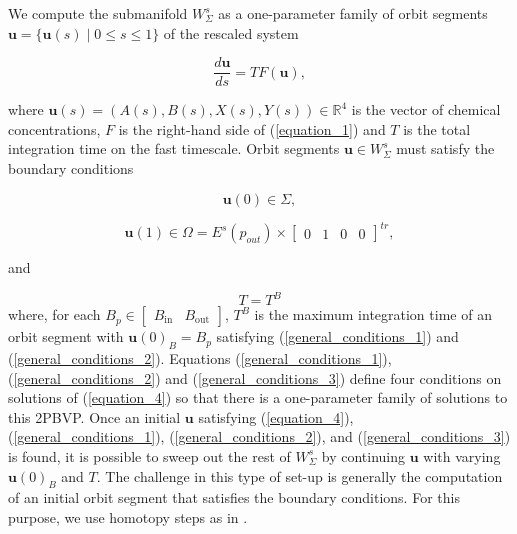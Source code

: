 \documentclass{ws-ijbc}
\begin{document}
We compute the submanifold $W^s_{\Sigma}$ as a one-parameter family of orbit segments $\mathbf{u} = \{\mathbf{u}(s) \;|\; 0 \leq s \leq 1 \}$ of the rescaled system

\begin{equation}
\frac{d\mathbf{u}}{ds} = TF(\mathbf{u}),
\label{equation_4}
\end{equation}
    
\noindent
where $\mathbf{u}(s) = (A(s), B(s), X(s), Y(s)) \in \mathbb{R}^4$ is the vector of chemical concentrations, $F$ is the right-hand side of (\ref{equation_1}) and $T$ is the total integration time on the fast timescale.  Orbit segments $\mathbf{u} \in W^s_{\Sigma}$ must satisfy the boundary conditions

 \begin{equation}
	\mathbf{u}(0) \in \Sigma,
	\label{general_conditions_1}
\end{equation}

\begin{equation}
	\mathbf{u}(1) \in \Omega = E^s(p_{out}) \times \begin{bmatrix} 0 & 1 & 0 & 0 \end{bmatrix}^{tr},
	\label{general_conditions_2}
\end{equation}

and

\begin{equation}
	T=T^{B}
	\label{general_conditions_3}
\end{equation}
where, for each $B_p \in \begin{bmatrix} B_{\text{in}} & B_{\text{out}} \end{bmatrix}$, $T^{B}$ is the maximum integration time of an orbit segment with $\mathbf{u}(0)_B=B_p$ satisfying (\ref{general_conditions_1}) and (\ref{general_conditions_2}).  Equations (\ref{general_conditions_1}), (\ref{general_conditions_2})  and (\ref{general_conditions_3}) define four conditions on solutions of (\ref{equation_4}) so that there is a one-parameter family of solutions to this 2PBVP.  Once an initial $\mathbf{u}$ satisfying (\ref{equation_4}), (\ref{general_conditions_1}), (\ref{general_conditions_2}), and (\ref{general_conditions_3}) is found, it is possible to sweep out the rest of $W^s_{\Sigma}$ by continuing $\mathbf{u}$ with varying $\mathbf{u}(0)_B$ and $T$.  The challenge in this type of set-up is generally the computation of an initial orbit segment that satisfies the boundary conditions.  For this purpose, we use homotopy steps as in  \cite{homotopy_example, Saeed_Paper}.
\end{document}
